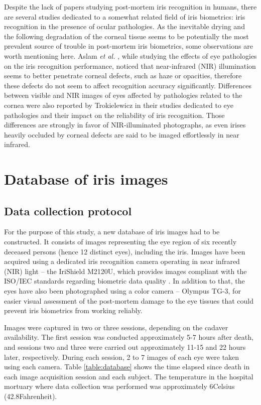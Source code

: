 \documentclass[10pt,twocolumn,letterpaper]{article}
\begin{document}
Despite the lack of papers studying post-mortem iris recognition in humans, there are several studies dedicated to a somewhat related field of iris biometrics: iris recognition in the presence of ocular pathologies. As the inevitable drying and the following degradation of the corneal tissue seems to be potentially the most prevalent source of trouble in post-mortem iris biometrics, some observations are worth mentioning here. Aslam \emph{et al.} \cite{Aslam}, while studying the effects of eye pathologies on the iris recognition performance, noticed that near-infrared (NIR) illumination seems to better penetrate corneal defects, such as haze or opacities, therefore these defects do not seem to affect recognition accuracy significantly. Differences between visible and NIR images of eyes affected by pathologies related to the cornea were also reported by Trokielewicz \etal\cite{TrokielewiczBTAS2015, TrokielewiczCYBCONF2015} in their studies dedicated to eye pathologies and their impact on the reliability of iris recognition. Those differences are strongly in favor of NIR-illuminated photographs, as even irises heavily occluded by corneal defects are said to be imaged effortlessly in near infrared.


\section{Database of iris images}
\label{sec:DataCollection}
\subsection{Data collection protocol}
For the purpose of this study, a new database of iris images had to be constructed. It consists of images representing the eye region of six recently deceased persons (hence 12 distinct eyes), including the iris. Images have been acquired using a dedicated iris recognition camera operating in near infrared (NIR) light -- the IriShield M2120U, which provides images compliant with the ISO/IEC standards regarding biometric data quality \cite{ISO,ISO2}. In addition to that, the eyes have also been photographed using a color camera -- Olympus TG-3, for easier visual assessment of the post-mortem damage to the eye tissues that could prevent iris biometrics from working reliably.

Images were captured in two or three sessions, depending on the cadaver availability. The first session was conducted approximately 5-7 hours after death, and sessions two and three were carried out approximately 11-15 and 22 hours later, respectively. During each session, 2 to 7 images of each eye were taken using each camera. Table \ref{table:database} shows the time elapsed since death in each image acquisition session and each subject. The temperature in the hospital mortuary where data collection was performed was approximately 6\degree  Celsius (42.8\degree  Fahrenheit).
\end{document}
